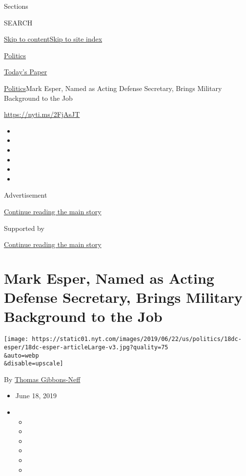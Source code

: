 Sections

SEARCH

\protect\hyperlink{site-content}{Skip to
content}\protect\hyperlink{site-index}{Skip to site index}

\href{https://www.nytimes.com/section/politics}{Politics}

\href{https://myaccount.nytimes.com/auth/login?response_type=cookie\&client_id=vi}{}

\href{https://www.nytimes.com/section/todayspaper}{Today's Paper}

\href{/section/politics}{Politics}\textbar{}Mark Esper, Named as Acting
Defense Secretary, Brings Military Background to the Job

\url{https://nyti.ms/2FjAsJT}

\begin{itemize}
\item
\item
\item
\item
\item
\item
\end{itemize}

Advertisement

\protect\hyperlink{after-top}{Continue reading the main story}

Supported by

\protect\hyperlink{after-sponsor}{Continue reading the main story}

\hypertarget{mark-esper-named-as-acting-defense-secretary-brings-military-background-to-the-job}{%
\section{Mark Esper, Named as Acting Defense Secretary, Brings Military
Background to the
Job}\label{mark-esper-named-as-acting-defense-secretary-brings-military-background-to-the-job}}

\texttt{[image: https://static01.nyt.com/images/2019/06/22/us/politics/18dc-esper/18dc-esper-articleLarge-v3.jpg?quality=75\\\&auto=webp\\\&disable=upscale]}

By \href{https://www.nytimes.com/by/thomas-gibbons-neff}{Thomas
Gibbons-Neff}

\begin{itemize}
\item
  June 18, 2019
\item
  \begin{itemize}
  \item
  \item
  \item
  \item
  \item
  \item
  \end{itemize}
\end{itemize}

